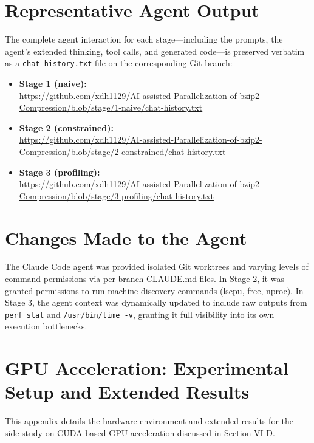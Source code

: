 \documentclass[conference]{IEEEtran}
\begin{document}
\section{Representative Agent Output}

The complete agent interaction for each stage---including the prompts, the
agent's extended thinking, tool calls, and generated code---is preserved
verbatim as a \texttt{chat-history.txt} file on the corresponding Git branch:

\begin{itemize}
  \item \textbf{Stage 1 (naive):}\\
  \url{https://github.com/xdh1129/AI-assisted-Parallelization-of-bzip2-Compression/blob/stage/1-naive/chat-history.txt}
  \item \textbf{Stage 2 (constrained):}\\
  \url{https://github.com/xdh1129/AI-assisted-Parallelization-of-bzip2-Compression/blob/stage/2-constrained/chat-history.txt}
  \item \textbf{Stage 3 (profiling):}\\
  \url{https://github.com/xdh1129/AI-assisted-Parallelization-of-bzip2-Compression/blob/stage/3-profiling/chat-history.txt}
\end{itemize}

\section{Changes Made to the Agent}
The Claude Code agent was provided isolated Git worktrees and varying levels of command permissions via per-branch CLAUDE.md files. In Stage 2, it was granted permissions to run machine-discovery commands (lscpu, free, nproc). In Stage 3, the agent context was dynamically updated to include raw outputs from \texttt{perf stat} and \texttt{/usr/bin/time -v}, granting it full visibility into its own execution bottlenecks.

\section{GPU Acceleration: Experimental Setup and Extended Results}
\label{app:gpu}
This appendix details the hardware environment and extended results for the side-study on CUDA-based GPU acceleration discussed in Section VI-D.
\end{document}
